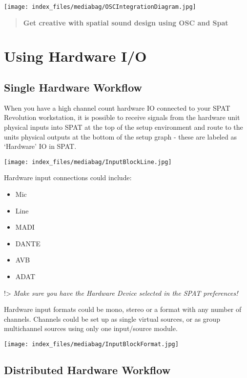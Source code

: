 \documentclass[
  letterpaper,
  DIV=11,
  numbers=noendperiod]{scrreport}
\providecommand{\tightlist}{%
  \setlength{\itemsep}{0pt}\setlength{\parskip}{0pt}}\usepackage{longtable,booktabs,array}
\begin{document}
\texttt{[image: index\_files/mediabag/OSCIntegrationDiagram.jpg]}

\begin{quote}
\textbf{Get creative with spatial sound design using OSC and Spat}
\end{quote}

\hypertarget{using-hardware-io}{%
\chapter{Using Hardware I/O}\label{using-hardware-io}}

\hypertarget{single-hardware-workflow}{%
\section{Single Hardware Workflow}\label{single-hardware-workflow}}

When you have a high channel count hardware IO connected to your SPAT
Revolution workstation, it is possible to receive signals from the
hardware unit physical inputs into SPAT at the top of the setup
environment and route to the units physical outputs at the bottom of the
setup graph - these are labeled as `Hardware' IO in SPAT.

\texttt{[image: index\_files/mediabag/InputBlockLine.jpg]}

Hardware input connections could include:

\begin{itemize}
\tightlist
\item
  Mic
\item
  Line
\item
  MADI
\item
  DANTE
\item
  AVB
\item
  ADAT
\end{itemize}

!\textgreater{} \emph{Make sure you have the Hardware Device selected in
the SPAT preferences!}

Hardware input formats could be mono, stereo or a format with any number
of channels. Channels could be set up as single virtual sources, or as
group multichannel sources using only one input/source module.

\texttt{[image: index\_files/mediabag/InputBlockFormat.jpg]}

\hypertarget{distributed-hardware-workflow}{%
\section{Distributed Hardware
Workflow}\label{distributed-hardware-workflow}}
\end{document}
